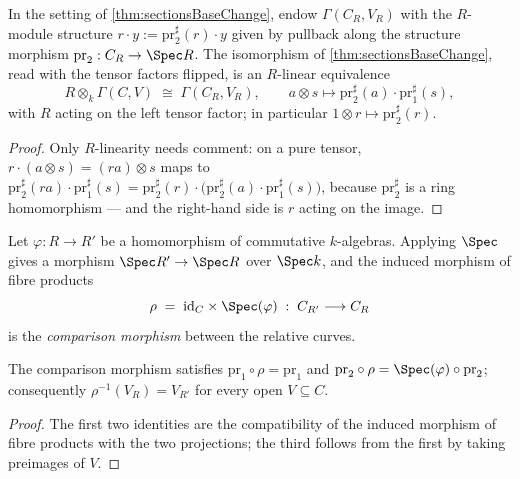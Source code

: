 \begin{definition}
  \label{def:relSectionsBaseChange}
  \leanok
  In the setting of \ref{thm:sectionsBaseChange}, endow \(\Gamma(C_R, V_R)\) with the
  \(R\)-module structure \(r \cdot y := \mathrm{pr}_2^{\sharp}(r) \cdot y\) given by
  pullback along the structure morphism \(\mathrm{pr}_2 : C_R \to \Spec R\). The
  isomorphism of \ref{thm:sectionsBaseChange}, read with the tensor factors flipped, is
  an \(R\)-linear equivalence
  \[
    R \otimes_k \Gamma(C, V) \;\cong\; \Gamma(C_R, V_R), \qquad
    a \otimes s \longmapsto \mathrm{pr}_2^{\sharp}(a) \cdot \mathrm{pr}_1^{\sharp}(s),
  \]
  with \(R\) acting on the left tensor factor; in particular
  \(1 \otimes r \mapsto \mathrm{pr}_2^{\sharp}(r)\).
\end{definition}
\begin{proof}
  \leanok
  Only \(R\)-linearity needs comment: on a pure tensor,
  \(r \cdot (a \otimes s) = (ra) \otimes s\) maps to
  \(\mathrm{pr}_2^{\sharp}(ra) \cdot \mathrm{pr}_1^{\sharp}(s) =
  \mathrm{pr}_2^{\sharp}(r) \cdot \bigl(\mathrm{pr}_2^{\sharp}(a) \cdot
  \mathrm{pr}_1^{\sharp}(s)\bigr)\), because \(\mathrm{pr}_2^{\sharp}\) is a ring
  homomorphism --- and the right-hand side is \(r\) acting on the image.
\end{proof}

\begin{definition}
  \label{def:relCurveMap}
  \leanok
  Let \(\varphi : R \to R'\) be a homomorphism of commutative \(k\)-algebras. Applying
  \(\Spec\) gives a morphism \(\Spec R' \to \Spec R\) over \(\Spec k\), and the induced
  morphism of fibre products
  \[
    \rho \;=\; \mathrm{id}_C \times \Spec(\varphi) \;:\; C_{R'} \longrightarrow C_R
  \]
  is the \emph{comparison morphism} between the relative curves.
\end{definition}

\begin{lemma}
  \label{lem:relCurveMap_proj}
  \leanok
  The comparison morphism satisfies
  \(\mathrm{pr}_1 \circ \rho = \mathrm{pr}_1\) and
  \(\mathrm{pr}_2 \circ \rho = \Spec(\varphi) \circ \mathrm{pr}_2\); consequently
  \(\rho^{-1}(V_R) = V_{R'}\) for every open \(V \subseteq C\).
\end{lemma}
\begin{proof}
  \leanok
  The first two identities are the compatibility of the induced morphism of fibre
  products with the two projections; the third follows from the first by taking
  preimages of \(V\).
\end{proof}

